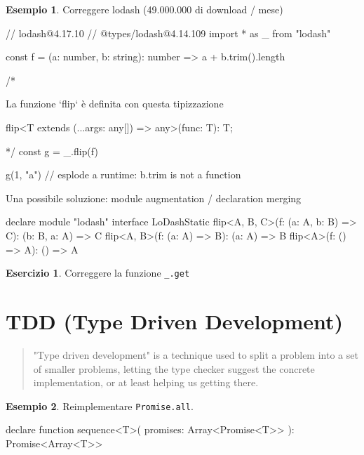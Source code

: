 \documentclass[12pt]{article}
\theoremstyle{definition}
\newtheorem{example}{Esempio}[subsection]
\newtheorem{exercise}{Esercizio}[subsection]
\newenvironment{code}
  {\vspace{0.5cm} \VerbatimEnvironment\begin{typescriptcode}}
  {\end{typescriptcode} \vspace{0.2cm}}
\begin{document}
\begin{example}
Correggere lodash (49.000.000 di download / mese)

\begin{code}
// lodash@4.17.10
// @types/lodash@4.14.109
import * as _ from "lodash"

const f = (a: number, b: string): number =>
  a + b.trim().length

/*

  La funzione `flip` è definita con questa tipizzazione

  flip<T extends (...args: any[]) => any>(func: T): T;

*/
const g = _.flip(f)

g(1, "a") // esplode a runtime: b.trim is not a function
\end{code}

Una possibile soluzione: module augmentation / declaration merging

\begin{code}
declare module "lodash" {
  interface LoDashStatic {
    flip<A, B, C>(f: (a: A, b: B) => C): (b: B, a: A) => C
    flip<A, B>(f: (a: A) => B): (a: A) => B
    flip<A>(f: () => A): () => A
  }
}
\end{code}

\end{example}

\begin{exercise}
Correggere la funzione \texttt{\_.get}
\end{exercise}

\newpage
\section{TDD (Type Driven Development)}

\begin{quote}
"Type driven development" is a technique used to split a problem into a set of smaller problems,
letting the type checker suggest the concrete implementation, or at least helping us getting there.
\end{quote}

\begin{example}
Reimplementare \texttt{Promise.all}.

\begin{code}
declare function sequence<T>(
  promises: Array<Promise<T>>
): Promise<Array<T>>
\end{code}

\end{example}
\end{document}
